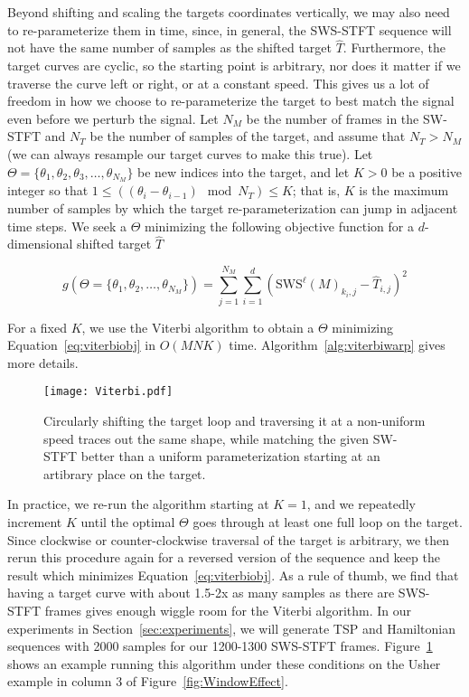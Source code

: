 \documentclass[runningheads]{llncs}
\begin{document}
Beyond shifting and scaling the targets coordinates vertically, we may also need to re-parameterize them in time, since, in general, the SWS-STFT sequence will not have the same number of samples as the shifted target $\hat{T}$.  Furthermore, the target curves are cyclic, so the starting point is arbitrary, nor does it matter if we traverse the curve left or right, or at a constant speed.  This gives us a lot of freedom in how we choose to re-parameterize the target to best match the signal even before we perturb the signal.  Let $N_M$ be the number of frames in the SW-STFT and $N_T$ be the number of samples of the target, and assume that $N_T > N_M$ (we can always resample our target curves to make this true).  Let $\Theta = \{ \theta_1, \theta_2, \theta_3, \hdots, \theta_{N_M} \}$ be new indices into the target, and let $K > 0$ be a positive integer so that $1 \leq \left( (\theta_i - \theta_{i-1}) \mod N_T \right) \leq K$; that is, $K$ is the maximum number of samples by which the target re-parameterization can jump in adjacent time steps.  We seek a $\Theta$ minimizing the following objective function for a $d$-dimensional shifted target $\hat{T}$

\begin{equation}
  \label{eq:viterbiobj}
  g(\Theta = \{\theta_1, \theta_2, \hdots, \theta_{N_M}\}) = \sum_{j = 1}^{N_M} \sum_{i=1}^d \left( \text{SWS}^{\ell} (M)_{k_i, j} - \hat{T}_{i, j}  \right)^2
\end{equation}

For a fixed $K$, we use the Viterbi algorithm to obtain a $\Theta$ minimizing Equation~\ref{eq:viterbiobj} in $O(MNK)$ time.  Algorithm~\ref{alg:viterbiwarp} gives more details.  

\begin{figure}
  \centering
  \texttt{[image: Viterbi.pdf]}
  \caption{Circularly shifting the target loop and traversing it at a non-uniform speed traces out the same shape, while matching the given SW-STFT better than a uniform parameterization starting at an artibrary place on the target.}
  \label{fig:ViterbiWarp}
\end{figure}

In practice, we re-run the algorithm starting at $K = 1$, and we repeatedly increment $K$ until the optimal $\Theta$ goes through at least one full loop on the target.  Since clockwise or counter-clockwise traversal of the target is arbitrary, we then rerun this procedure again for a reversed version of the sequence and keep the result which minimizes Equation~\ref{eq:viterbiobj}.  As a rule of thumb, we find that having a target curve with about 1.5-2x as many samples as there are SWS-STFT frames gives enough wiggle room for the Viterbi algorithm.  In our experiments in Section~\ref{sec:experiments}, we will generate TSP and Hamiltonian sequences with 2000 samples for our 1200-1300 SWS-STFT frames.  Figure~\ref{fig:ViterbiWarp} shows an example running this algorithm under these conditions on the Usher example in column 3 of Figure~\ref{fig:WindowEffect}.
\end{document}
